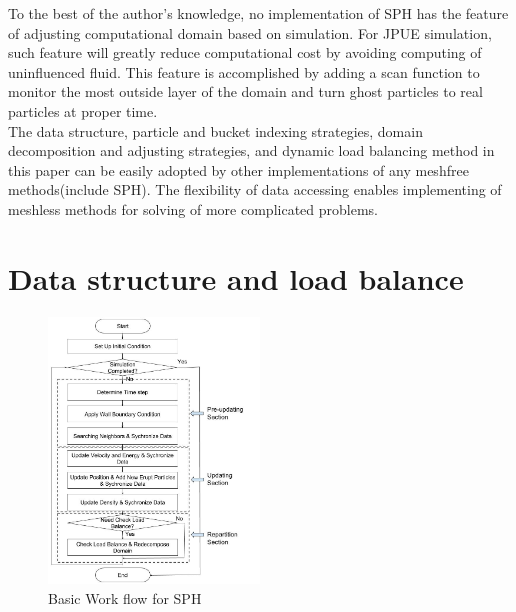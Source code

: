 \documentclass[10pt,a4paper]{article}
\begin{document}
To the best of the author's knowledge, no implementation of SPH has the feature of adjusting computational domain based on simulation. For JPUE simulation, such feature will greatly reduce computational cost by avoiding computing of uninfluenced fluid. This feature is accomplished by adding a scan function to monitor the most outside layer of the domain and turn ghost particles to real particles at proper time. 
\\
The data structure, particle and bucket indexing strategies, domain decomposition and adjusting strategies, and dynamic load balancing method in this paper can be easily adopted by other implementations of any meshfree methods(include SPH). The flexibility of data accessing enables implementing of meshless methods for solving of more complicated problems.\\
\section{Data structure and load balance}

\begin{figure}[h]
\caption{Basic Work flow for SPH}
\centering
\label{fig:Work_flow}
\includegraphics[width=0.5\textwidth]{Work_flow}
\end{figure}
\end{document}
